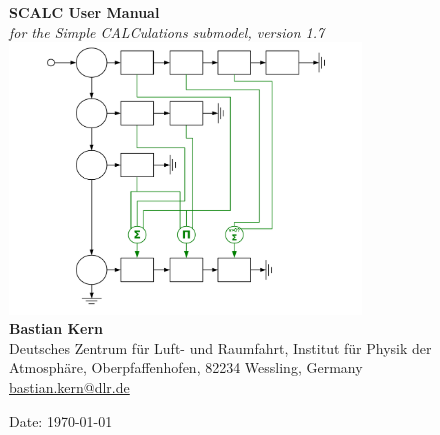 \documentclass[twoside]{article}
\begin{document}
\thispagestyle{empty}
\begin{center}
  {\Huge\bf SCALC User Manual}\\[3mm]
  {\huge\it for the Simple CALCulations submodel, version 1.7}\\[9mm]
  {\includegraphics[width=0.7\textwidth]{scalc_front}}\\[21mm]
  {\LARGE\bf Bastian Kern}\\[9mm]
  \Large
  Deutsches Zentrum f\"{u}r Luft- und Raumfahrt, Institut
  f\"{u}r Physik der Atmosph\"{a}re, Oberpfaffenhofen, 82234 Wessling,
       Germany\\
  \url{bastian.kern@dlr.de}

\end{center}

\vfill


\begin{center}
  Date: \today
\end{center}

\newpage
\tableofcontents
\newpage
\end{document}
